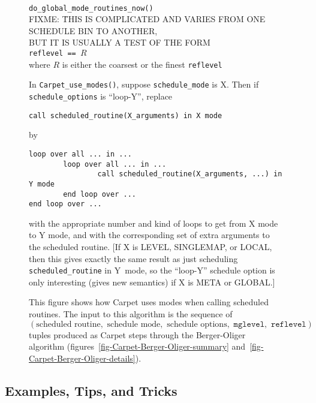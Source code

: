 \documentclass{article}
\begin{document}
\begin{figure}
\begin{tabbing}
  						\\
%
\end{tabbing}
\begin{tabbing}
  \verb|do_global_mode_routines_now()|		\\
FIXME: \=THIS IS COMPLICATED
         AND VARIES FROM ONE SCHEDULE BIN TO ANOTHER,			\\
       \>BUT IT IS USUALLY A TEST OF THE FORM				\\
       \>\verb|reflevel == |$R$						\\
       \>where $R$ is either the coarsest or the finest \verb|reflevel|	\\
\end{tabbing}
%
In \verb|Carpet_use_modes()|, suppose \verb|schedule_mode| is X.
Then if \verb|schedule_options| is ``loop-Y'', replace
\begin{verbatim}
call scheduled_routine(X_arguments) in X mode
\end{verbatim}
by
\begin{verbatim}
loop over all ... in ...
        loop over all ... in ...
                call scheduled_routine(X_arguments, ...) in Y mode
        end loop over ...
end loop over ...
\end{verbatim}
with the appropriate number and kind of loops to get from X mode to Y mode,
and with the corresponding set of extra arguments to the scheduled routine.
[If X is LEVEL, SINGLEMAP, or LOCAL, then this gives exactly the same
result as just scheduling \verb|scheduled_routine| in Y~mode, so the
``loop-Y'' schedule option is only interesting (gives new semantics)
if X is META or GLOBAL.]
\caption[How Carpet uses Modes when Calling Scheduled Routines]
	{
	This figure shows how Carpet uses modes when calling
	scheduled routines.  The input to this algorithm is the
	sequence of
	$(\textrm{scheduled routine},\,\,
	  \textrm{schedule mode},\,\, \textrm{schedule options},\,\,
	  \texttt{mglevel},\,\, \texttt{reflevel})$
	tuples produced as Carpet steps through the Berger-Oliger
	algorithm (figures~\protect\ref{fig-Carpet-Berger-Oliger-summary}
	and~\protect\ref{fig-Carpet-Berger-Oliger-details}).
	}
\label{fig-how-Carpet-uses-modes}
\end{figure}


\subsection{Examples, Tips, and Tricks}
\end{document}
